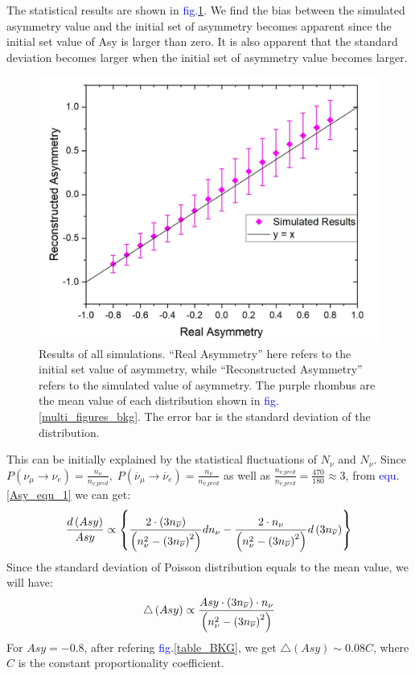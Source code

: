 \documentclass[a4paper,12pt]{article}
\begin{document}
The statistical results are shown in \textcolor{blue}{fig.\ref{final_result_bkg}}.
We find the bias between the simulated asymmetry value and the initial set of asymmetry becomes apparent since the initial set value of Asy is larger than zero. It is also apparent that the standard deviation becomes larger when the initial set of asymmetry value becomes larger.
\begin{figure}[H]
    \centering
    \includegraphics[width=12cm]{Images/distribution_bkg.JPG}
    \caption{Results of all simulations. 
“Real Asymmetry” here refers to the initial set value of asymmetry, while “Reconstructed Asymmetry” refers to the simulated value of asymmetry. The purple rhombus are the mean value of each distribution shown in \textcolor{blue}{fig.\ref{multi_figures_bkg}}. The error bar is the standard deviation of the distribution.}
    \label{final_result_bkg}
\end{figure} 
This can be initially explained by the statistical fluctuations of $N_\nu$ and $N_{\overline\nu}$. Since $P\left(\nu_\mu\rightarrow\nu_e\right)=\frac{n_\nu}{n_{\nu\_pred}},\;P\left({\overline\nu}_\mu\rightarrow{\overline\nu}_e\right)=\frac{\displaystyle n_{\overline\nu}}{\displaystyle n_{\overline\nu\_pred}}$ as well as $\frac{\displaystyle n_{\nu\_pred}}{\displaystyle n_{\overline\nu\_pred}}=\frac{\displaystyle470}{\displaystyle180}\approx3$, 
from \textcolor{blue}{equ.\ref{Asy_equ_1}} we can get:
\begin{equation}
\large
    \frac{d\left(Asy\right)}{Asy}\propto\left\{\frac{2\cdot\left(3n_{\overline\nu}\right)}{\left(n_\nu^2-\left(3n_{\overline\nu}\right)^2\right)}dn_\nu-\frac{2\cdot n_\nu}{\left(n_\nu^2-\left(3n_{\overline\nu}\right)^2\right)}d\left(3n_{\overline\nu}\right)\right\}
\end{equation}
Since the standard deviation of Poisson distribution equals to the mean value, we will have:
\begin{equation}
    \large
    \triangle\left(Asy\right)\propto\frac{Asy\cdot\left(3n_{\overline\nu}\right)\cdot n_\nu}{\left(n_\nu^2-\left(3n_{\overline\nu}\right)^2\right)}
\end{equation}
For $Asy=-0.8$, after refering \textcolor{blue}{fig.\ref{table_BKG}}, we get $\triangle\left(Asy\right)\sim0.08C$, where $C$ is the constant proportionality coefficient.
\end{document}
